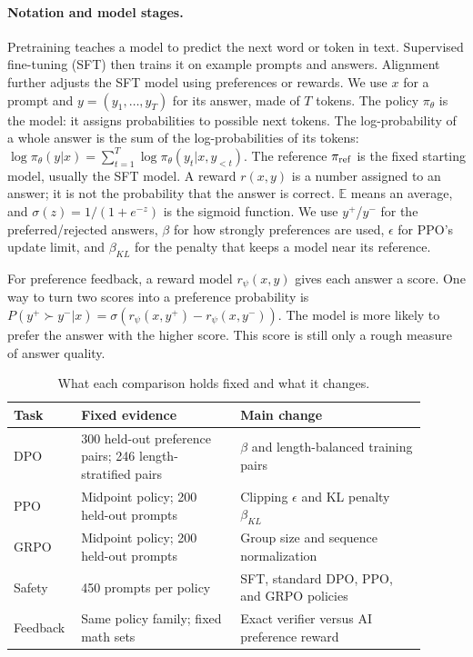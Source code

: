 \documentclass[10pt]{article}
\begin{document}
\paragraph{Notation and model stages.} Pretraining teaches a model to predict the next word or token in text. Supervised fine-tuning (SFT) then trains it on example prompts and answers. Alignment further adjusts the SFT model using preferences or rewards. We use $x$ for a prompt and $y=(y_1,\ldots,y_T)$ for its answer, made of $T$ tokens. The policy $\pi_\theta$ is the model: it assigns probabilities to possible next tokens. The log-probability of a whole answer is the sum of the log-probabilities of its tokens: $\log\pi_\theta(y|x)=\sum_{t=1}^T\log\pi_\theta(y_t|x,y_{<t})$. The reference $\pi_{\rm ref}$ is the fixed starting model, usually the SFT model. A reward $r(x,y)$ is a number assigned to an answer; it is not the probability that the answer is correct. $\mathbb{E}$ means an average, and $\sigma(z)=1/(1+e^{-z})$ is the sigmoid function. We use $y^+$/$y^-$ for the preferred/rejected answers, $\beta$ for how strongly preferences are used, $\epsilon$ for PPO's update limit, and $\beta_{KL}$ for the penalty that keeps a model near its reference.

For preference feedback, a reward model $r_\psi(x,y)$ gives each answer a score. One way to turn two scores into a preference probability is $P(y^+\succ y^-|x)=\sigma(r_\psi(x,y^+)-r_\psi(x,y^-))$. The model is more likely to prefer the answer with the higher score. This score is still only a rough measure of answer quality.

\begin{table}[h]
\centering\small
\caption{What each comparison holds fixed and what it changes.}
\begin{tabular}{p{0.12\linewidth}p{0.36\linewidth}p{0.42\linewidth}}
\toprule
Task & Fixed evidence & Main change \\
\midrule
DPO & 300 held-out preference pairs; 246 length-stratified pairs & $\beta$ and length-balanced training pairs \\
PPO & Midpoint policy; 200 held-out prompts & Clipping $\epsilon$ and KL penalty $\beta_{KL}$ \\
GRPO & Midpoint policy; 200 held-out prompts & Group size and sequence normalization \\
Safety & 450 prompts per policy & SFT, standard DPO, PPO, and GRPO policies \\
Feedback & Same policy family; fixed math sets & Exact verifier versus AI preference reward \\
\bottomrule
\end{tabular}
\end{table}
\end{document}
